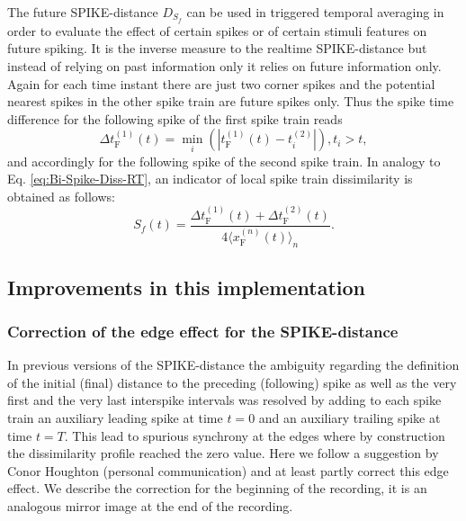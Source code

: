 \documentclass[10pt,twocolumn]{elsart5p}
\begin{document}
The future SPIKE-distance $D_{S_f}$ can be used in triggered temporal averaging in order to evaluate the effect of certain spikes or of certain stimuli features on future spiking. It is the inverse measure to the realtime SPIKE-distance but instead of relying on past information only it relies on future information only. Again for each time instant there are just two corner spikes and the potential nearest spikes in the other spike train are future spikes only. Thus the spike time difference for the following spike of the first spike train reads
%
\begin{equation} \label{eq:Delta-Corner-Spike-Future}
     \Delta t_{\mathrm {F}}^{(1)} (t) = \min_i (| t_{\mathrm {F}}^{(1)} (t) - t_i^{(2)} |), t_i > t,
\end{equation}
%
and accordingly for the following spike of the second spike train. In analogy to Eq. \ref{eq:Bi-Spike-Diss-RT}, an indicator of local spike train dissimilarity is obtained as follows:
%
\begin{equation} \label{eq:Bi-Spike-Diss-FT}
    S_f (t) = \frac{ \Delta t_{\mathrm {F}}^{(1)} (t) + \Delta t_{\mathrm {F}}^{(2)} (t)} {4 \langle x_{\mathrm {F}}^{(n)} (t) \rangle_n}.
\end{equation}	



\subsection{\label{ss:Improvements} Improvements in this implementation}

\subsubsection{\label{sss:Edge-effect} Correction of the edge effect for the SPIKE-distance}

In previous versions of the SPIKE-distance the ambiguity regarding the definition of the initial (final) distance to the preceding (following) spike as well as the very first and the very last interspike intervals was resolved by adding to each spike train an auxiliary leading spike at time $t = 0$ and an auxiliary trailing spike at time $t = T$. This lead to spurious synchrony at the edges where by construction the dissimilarity profile reached the zero value. Here we follow a suggestion by Conor Houghton (personal communication) and at least partly correct this edge effect. We describe the correction for the beginning of the recording, it is an analogous mirror image at the end of the recording.
\end{document}
